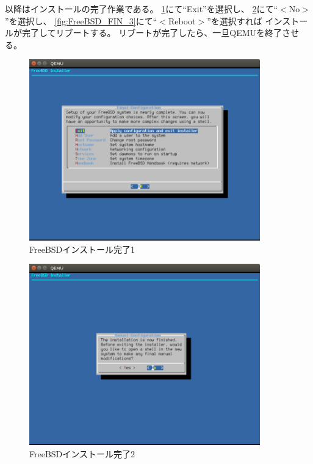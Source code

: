 \documentclass[a4j]{jarticle}
\begin{document}
以降はインストールの完了作業である。
\ref{fig:FreeBSD_FIN_1}にて``Exit''を選択し、
\ref{fig:FreeBSD_FIN_2}にて``$<$No$>$''を選択し、
\ref{fig:FreeBSD_FIN_3}にて``$<$Reboot$>$''を選択すれば
インストールが完了してリブートする。
リブートが完了したら、一旦QEMUを終了させる。
\begin{figure}[htbp]
	\begin{center}
    	\includegraphics[width=10cm]{./IMG/FreeBSD_FIN.png}
	\end{center}
    \caption{FreeBSDインストール完了1}
    \label{fig:FreeBSD_FIN_1}
\end{figure}
\begin{figure}[htbp]
	\begin{center}
    	\includegraphics[width=10cm]{./IMG/FreeBSD_LST.png}
	\end{center}
    \caption{FreeBSDインストール完了2}
    \label{fig:FreeBSD_FIN_2}
\end{figure}
\end{document}
